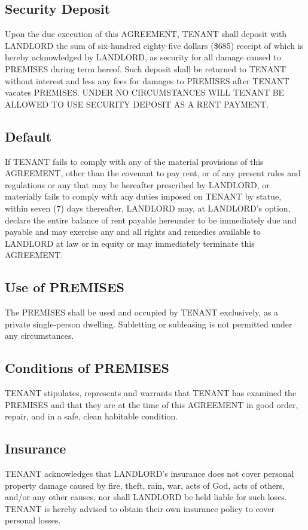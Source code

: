 \documentclass[11pt]{article}
\begin{document}
\subsection*{Security Deposit}
\label{sec:orgf681178}
Upon the due execution of this AGREEMENT, TENANT shall deposit with
LANDLORD the sum of six-hundred eighty-five dollars (\$685) receipt of
which is hereby acknowledged by LANDLORD, as security for all damage
caused to PREMISES during term hereof. Such deposit shall be returned
to TENANT without interest and less any fees for damages to PREMISES
after TENANT vacates PREMISES.  UNDER NO CIRCUMSTANCES WILL TENANT BE
ALLOWED TO USE SECURITY DEPOSIT AS A RENT PAYMENT.
\subsection*{Default}
\label{sec:org96329df}
If TENANT fails to comply with any of the material provisions of this
AGREEMENT, other than the covenant to pay rent, or of any present
rules and regulations or any that may be hereafter prescribed by
LANDLORD, or materially fails to comply with any duties imposed on
TENANT by statue, within seven (7) days thereafter, LANDLORD may, at
LANDLORD's option, declare the entire balance of rent payable
hereunder to be immediately due and payable and may exercise any and
all rights and remedies available to LANDLORD at law or in equity or
may immediately terminate this AGREEMENT.

\subsection*{Use of PREMISES}
\label{sec:org9c5f1f3}
The PREMISES shall be used and occupied by TENANT exclusively, as a
private single-person dwelling.  Subletting or subleasing is not
permitted under any circumstances.

\subsection*{Conditions of PREMISES}
\label{sec:org5d974af}
TENANT stipulates, represents and warrants that TENANT has examined
the PREMISES and that they are at the time of this AGREEMENT in good
order, repair, and in a safe, clean habitable condition.

\subsection*{Insurance}
\label{sec:org4322ded}
TENANT acknowledges that LANDLORD's insurance does not cover personal
property damage caused by fire, theft, rain, war, acts of God, acts of
others, and/or any other causes, nor shall LANDLORD be held liable for
such loses.  TENANT is hereby advised to obtain their own insurance
policy to cover personal losses.
\end{document}
